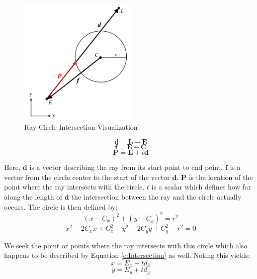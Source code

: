 \documentclass[12pt,onecolumn]{report}
\begin{document}
\begin{figure}
	\centering
	\includegraphics[width=0.5\textwidth]{Figs/rayCircle.png}
	\caption{{\small Ray-Circle Intersection Visualization}}    
	\label{fig:RayCircleIntersection}
\end{figure}
%
\begin{equation}\label{e:RayVector}
\boldsymbol{d} = \boldsymbol{L} - \boldsymbol{E}
\end{equation}
\begin{equation}\label{e:CircleCenterVector}
\boldsymbol{f} = \boldsymbol{E} - \boldsymbol{C} 
\end{equation}
\begin{equation}\label{e:Intersection}
\boldsymbol{P} = \boldsymbol{E} + t\boldsymbol{d}
\end{equation}

Here, $\boldsymbol{d}$ is a vector describing the ray from its start point to end point. $\boldsymbol{f}$ is a vector from the circle center to the start of the vector $\boldsymbol{d}$. $\boldsymbol{P}$ is the location of the point where the ray intersects with the circle. $t$ is a scalar which defines how far along the length of $\boldsymbol{d}$ the intersection between the ray and the circle actually occurs. The circle is then defined by:
%
\begin{equation}\label{e:Circle}
\left(x - C_{x}\right)^{2} +   \left(y - C_{y}\right)^{2} = r^2
\end{equation}
\begin{equation}\label{e:CircleExpanded}
x^2 - 2C_{x}x + C_{x}^{2} + y^2 - 2C_{y}y+ C_{y}^{2} - r^2 = 0
\end{equation}

We seek the point or points where the ray intersects with this circle which also happens to be described by Equation \ref{e:Intersection} as well. Noting this yields:
%
\begin{equation}\label{e:XIntersection}
x = E_{x} + td_{x} 
\end{equation}
\begin{equation}\label{e:YIntersection}
y = E_{y} + td_{y} 
\end{equation}
\end{document}
